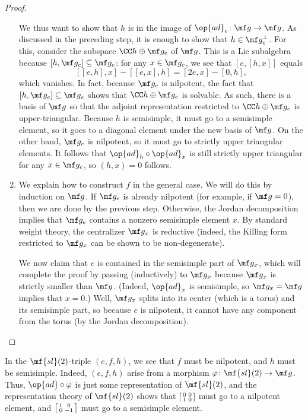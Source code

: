 \documentclass[../notes.tex]{subfiles}
\begin{document}
\begin{proof}
\begin{enumerate}
		We thus want to show that $h$ is in the image of $\op{ad}_e\colon\mf g\to\mf g$. As discussed in the preceding step, it is enough to show that $h\in\mf g_e^\perp$. For this, consider the subspace $\CC h\oplus\mf g_e$ of $\mf g$. This is a Lie subalgebra because $[h,\mf g_e]\subseteq\mf g_e$: for any $x\in\mf g_e$, we see that $[e,[h,x]]$ equals
		\[[[e,h],x]-[[e,x],h]=[2e,x]-[0,h],\]
		which vanishes. In fact, because $\mf g_e$ is nilpotent, the fact that $[h,\mf g_e]\subseteq\mf g_e$ shows that $\CC h\oplus\mf g_e$ is solvable. As such, there is a basis of $\mf g$ so that the adjoint representation restricted to $\CC h\oplus\mf g_e$ is upper-triangular. Because $h$ is semisimple, it must go to a semisimple element, so it goes to a diagonal element under the new basis of $\mf g$. On the other hand, $\mf g_e$ is nilpotent, so it must go to strictly upper triangular elements. It follows that ${\op{ad}_h}\circ{\op{ad}_x}$ is still strictly upper triangular for any $x\in\mf g_e$, so $(h,x)=0$ follows.

		\item We explain how to construct $f$ in the general case. We will do this by induction on $\mf g$. If $\mf g_e$ is already nilpotent (for example, if $\mf g=0$), then we are done by the previous step. Otherwise, the Jordan decomposition implies that $\mf g_e$ contains a nonzero semisimple element $x$. By standard weight theory, the centralizer $\mf g_x$ is reductive (indeed, the Killing form restricted to $\mf g_x$ can be shown to be non-degenerate).

		We now claim that $e$ is contained in the semisimple part of $\mf g_x$, which will complete the proof by passing (inductively) to $\mf g_x$ because $\mf g_x$ is strictly smaller than $\mf g$. (Indeed, $\op{ad}_x$ is semisimple, so $\mf g_x=\mf g$ implies that $x=0$.) Well, $\mf g_x$ splits into its center (which is a torus) and its semisimple part, so because $e$ is nilpotent, it cannot have any component from the torus (by the Jordan decomposition).
		\qedhere
	\end{enumerate}
\end{proof}
\begin{remark}
	In the $\mf{sl}(2)$-triple $(e,f,h)$, we see that $f$ must be nilpotent, and $h$ must be semisimple. Indeed, $(e,f,h)$ arise from a morphism $\varphi\colon\mf{sl}(2)\to\mf g$. Thus, ${\op{ad}}\circ\varphi$ is just some representation of $\mf{sl}(2)$, and the representation theory of $\mf{sl}(2)$ shows that $\begin{bsmallmatrix}
		0 & 0 \\ 1 & 0
	\end{bsmallmatrix}$ must go to a nilpotent element, and $\begin{bsmallmatrix}
		1 & 0 \\ 0 & -1
	\end{bsmallmatrix}$ must go to a semisimple element.
\end{remark}
\end{document}
